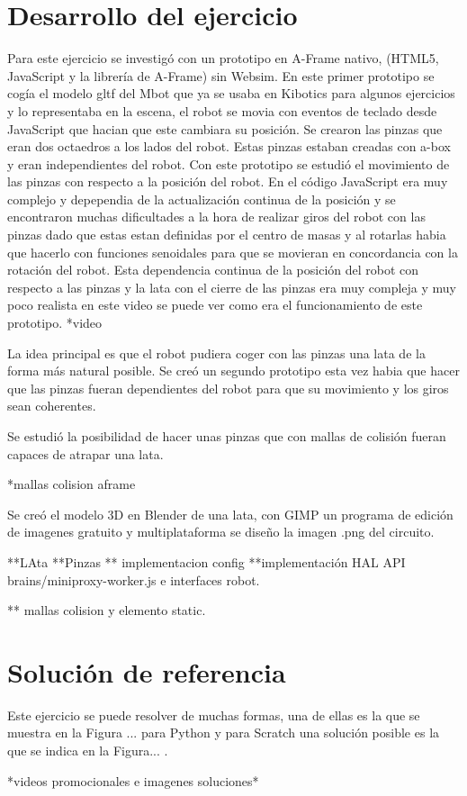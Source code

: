\section{Desarrollo del ejercicio}
Para este ejercicio se investigó con un prototipo en A-Frame nativo, (HTML5, JavaScript y la librería de A-Frame) sin Websim.
En este primer prototipo se cogía el modelo gltf del Mbot que ya se usaba en Kibotics para algunos ejercicios y lo representaba en la escena, el robot se movia con eventos de teclado desde JavaScript que hacian que este cambiara su posición. Se crearon las pinzas que eran dos octaedros a los lados del robot. Estas pinzas estaban creadas con a-box y eran  independientes del robot. Con este prototipo se estudió el movimiento de las pinzas con respecto a la posición del robot. En el código JavaScript era muy complejo y depependia de la actualización continua de la posición y se encontraron muchas dificultades a la hora de realizar giros del robot con las pinzas dado que estas estan definidas por el centro de masas y al rotarlas habia que hacerlo con funciones senoidales para que se movieran en concordancia con la rotación del robot. Esta dependencia continua de la posición del robot con respecto a las pinzas y la lata con el cierre de las pinzas era muy compleja y muy poco realista en este video se puede ver como era el funcionamiento de este prototipo. *video

La idea principal es que el robot pudiera coger con las pinzas una lata de la forma más natural posible. Se creó un segundo prototipo esta vez habia que hacer que las pinzas fueran dependientes del robot para que su movimiento y los giros sean coherentes.

Se estudió la posibilidad de hacer unas pinzas que con mallas de colisión fueran capaces de atrapar una lata.

*mallas colision aframe

Se creó el modelo 3D en Blender de una lata, con GIMP un programa de edición de imagenes gratuito y multiplataforma se diseño la imagen .png del circuito.

**LAta
**Pinzas
** implementacion config
**implementación HAL API  brains/miniproxy-worker.js e interfaces robot.

** mallas colision y elemento static. 


\section{Solución de referencia}
Este ejercicio se puede resolver de muchas formas, una de ellas es la que se muestra en la Figura ... para Python y para Scratch una solución posible es la que se indica en la Figura... . 

*videos promocionales e imagenes soluciones*